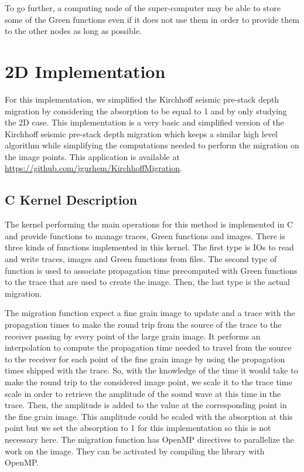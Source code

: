 To go further, a computing node of the super-computer may be able to store some of the Green functions even if it does not use them in order to provide them to the other nodes as long as possible.

\section{2D Implementation}

For this implementation, we simplified the Kirchhoff seismic pre-stack depth migration by considering the absorption to be equal to 1 and by only studying the 2D case.
This implementation is a very basic and simplified version of the Kirchhoff seismic pre-stack depth migration which keeps a similar high level algorithm while simplifying the computations needed to perform the migration on the image points.
This application is available at \url{https://github.com/jgurhem/KirchhoffMigration}.

\subsection{C Kernel Description}
The kernel performing the main operations for this method is implemented in C and provide functions to manage traces, Green functions and images.
There is three kinds of functions implemented in this kernel.
The first type is IOs to read and write traces, images and Green functions from files.
The second type of function is used to associate propagation time precomputed with Green functions to the trace that are used to create the image.
Then, the last type is the actual migration.

The migration function expect a fine grain image to update and a trace with the propagation times to make the round trip from the source of the trace to the receiver passing by every point of the large grain image.
It performs an interpolation to compute the propagation time needed to travel from the source to the receiver for each point of the fine grain image by using the propagation times shipped with the trace.
So, with the knowledge of the time it would take to make the round trip to the considered image point, we scale it to the trace time scale in order to retrieve the amplitude of the sound wave at this time in the trace.
Then, the amplitude is added to the value at the corresponding point in the fine grain image.
This amplitude could be scaled with the absorption at this point but we set the absorption to 1 for this implementation so this is not necessary here.
The migration function has OpenMP directives to parallelize the work on the image.
They can be activated by compiling the library with OpenMP.

